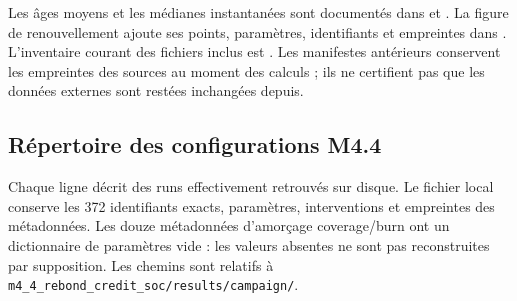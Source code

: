 Les âges moyens et les médianes instantanées sont documentés dans
 et .
La figure de renouvellement ajoute ses points, paramètres, identifiants et
empreintes dans .
L'inventaire courant des fichiers inclus est
. Les manifestes antérieurs
conservent les empreintes des sources au moment des calculs ; ils ne
certifient pas que les données externes sont restées inchangées depuis.

\subsection{Répertoire des configurations M4.4}
Chaque ligne décrit des runs effectivement retrouvés sur disque. Le fichier
local  conserve les 372 identifiants exacts,
paramètres, interventions et empreintes des métadonnées.
Les douze métadonnées d'amorçage coverage/burn ont un dictionnaire de paramètres vide : les valeurs absentes ne sont pas reconstruites par supposition. Les chemins sont
relatifs à \texttt{m4\_4\_rebond\_credit\_soc/results/campaign/}.
